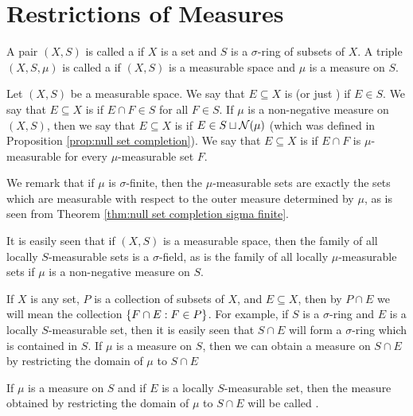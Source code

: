 
\section{Restrictions of Measures}

\begin{definition}
A pair $(X,S)$ is called a  if $X$ is a set and $S$ is a $\sigma$-ring of subsets of $X$. A triple $(X,S,\mu)$ is called a  if $(X,S)$ is a measurable space and $\mu$ is a measure on $S$.
\end{definition}

\begin{definition}
\label{def:measure space set locally}
Let $(X, S)$ be a measurable space. We say that $E \subseteq X$ is  (or just ) if $E \in S$. We say that $E \subseteq X$ is  if $E\cap F\in S$ for all $F \in S$. If $\mu$ is a non-negative measure on $(X, S)$, then we say that $E \subseteq X$ is  if $E \in S\sqcup{\cal N}(\mu)$ (which was defined in Proposition \ref{prop:null set completion}). We say that $E\subseteq X$ is  if $E\cap F$ is $\mu$-measurable for every $\mu$-measurable set $F$.
\end{definition}

We remark that if $\mu$ is $\sigma$-finite, then the $\mu$-measurable sets are exactly the sets which are measurable with respect to the outer measure determined by $\mu$, as is seen from Theorem \ref{thm:null set completion sigma finite}.

It is easily seen that if $(X, S)$ is a measurable space, then the family of all locally $S$-measurable sets is a $\sigma$-field, as is the family of all locally $\mu$-measurable sets if $\mu$ is a non-negative measure on $S$.

If $X$ is any set, $P$ is a collection of subsets of $X$, and $E \subseteq X$, then by $P \cap E$ we will mean the collection $\left\{F \cap E:F\in P\right\}$. For example, if $S$ is a $\sigma$-ring and $E$ is a locally $S$-measurable set, then it is easily seen that $S \cap E$ will form a $\sigma$-ring which is contained in $S$. If $\mu$ is a measure on $S$, then we can obtain a measure on $S \cap E$ by restricting the domain of $\mu$ to $S \cap E$

\begin{definition}
If $\mu$ is a measure on $S$ and if $E$ is a locally $S$-measurable set, then the measure obtained by restricting the domain of $\mu$ to $S \cap E$ will be called .
\end{definition}

